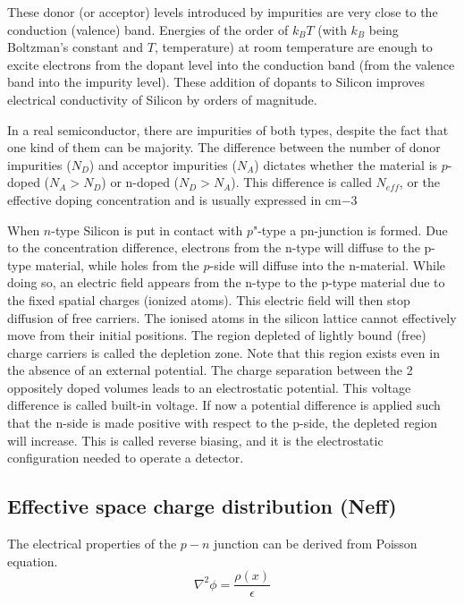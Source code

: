 These donor (or acceptor) levels introduced by impurities are very close to the
conduction (valence) band. Energies of the order of $k_B T$ (with $k_B$ being 
Boltzman's constant and $T$, temperature) at room temperature are enough to 
excite electrons from the dopant level into the conduction band (from the 
valence band into the impurity level). These addition of dopants to 
Silicon improves electrical conductivity of Silicon by orders of magnitude.  

In a real semiconductor, there are impurities of both types, despite the fact
that one kind of them can be majority. The difference between the number of
donor impurities ($N_D$) and acceptor impurities ($N_A$) dictates whether the
material is $p$-doped ($N_A > N_D $) or n-doped ($N_D > N_A$). This difference
is called $N_{eff}$, or the effective doping concentration and is usually 
expressed in cm$-3$

When $n$-type Silicon is put in contact with $p$"-type a pn-junction is formed.
Due to the concentration difference, electrons from the n-type will diffuse to
the p-type material, while holes from the $p$-side will diffuse into the
n-material. While doing so, an electric field appears from the n-type to the
p-type material due to the fixed spatial charges (ionized atoms). This electric
field will then stop diffusion of free carriers. The ionised atoms in the
silicon lattice cannot effectively move from their initial positions. The region
depleted of lightly bound (free) charge carriers is called the depletion zone.
Note that this region exists even in the absence of an external potential. The
charge separation between the 2 oppositely doped volumes leads to an electrostatic
potential. This voltage difference is called built-in
voltage. If now a potential difference is applied such that the n-side is made
positive with respect to the p-side, the depleted region will increase. This is
called reverse biasing, and it is the electrostatic configuration needed to 
operate a detector.

\subsection{Effective space charge distribution (Neff)} 

The electrical properties of the $p-n$ junction can be derived from Poisson equation. 
\begin{equation}
\nabla^2 \phi = \frac{\rho(x)}{\epsilon} 
\label{eq:poisson}
\end{equation}

